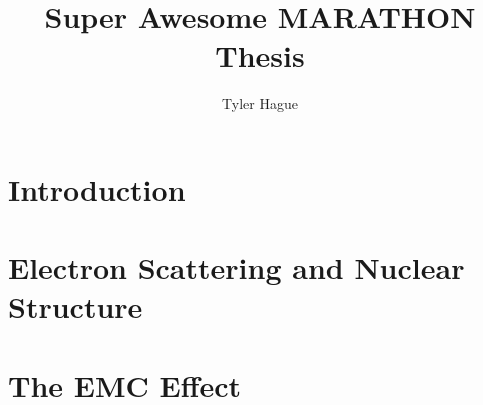 \documentclass[11pt]{ksudiss}                          %
\title{Super Awesome MARATHON Thesis}         %
\author{Tyler Hague}
\begin{document}

\begin{abstract}
  
\end{abstract}


\makefrontmatter




\begin{acknowledgments}
  
\end{acknowledgments}


\mainmatter

\chapter{\bf{Introduction}}


\chapter{\bf{Electron Scattering and Nuclear Structure}}             %


\chapter{\bf{The EMC Effect}}             %

\end{document}
